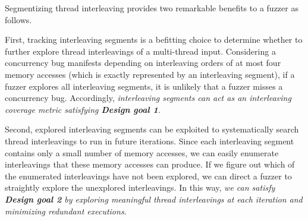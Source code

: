 



%
Segmentizing thread interleaving provides two remarkable benefits to a
fuzzer as follows.



First, tracking interleaving segments is a befitting choice to
determine whether to further explore thread interleavings of a
multi-thread input.
%
%
Considering a concurrency bug manifests depending on interleaving
orders of at most four memory accesses (which is exactly represented
by an interleaving segment), if a fuzzer explores all interleaving
segments, it is unlikely that a fuzzer misses a concurrency bug.
%
%
Accordingly, \textit{interleaving segments can act as an
  interleaving coverage metric satisfying \textbf{Design goal 1}}.





Second, explored interleaving segments can be exploited to
systematically search thread interleavings to run in future
iterations.
%
Since each interleaving segment contains only a small number of memory
accesses, we can easily enumerate interleavings that these memory
accesses can produce.
%
If we figure out which of the enumerated interleavings have not been
explored, we can direct a fuzzer to straightly explore the unexplored
interleavings.
%
In this way, \textit{we can satisfy \textbf{Design goal 2} by
  exploring meaningful thread interleavings at each iteration and
  minimizing redundant executions}.


